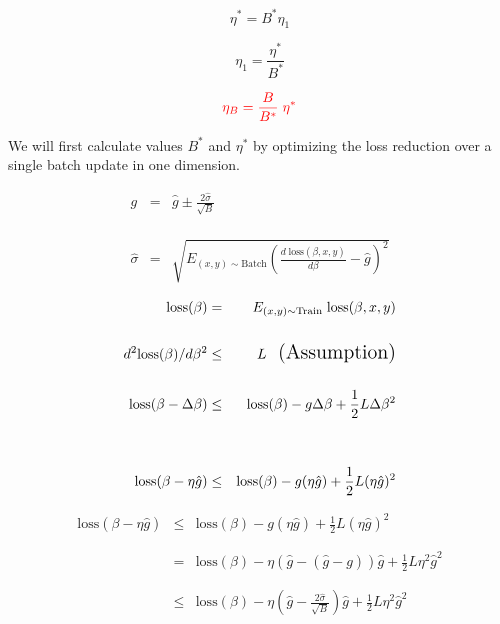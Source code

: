 {{\vfill
$$\eta^* = B^* \eta_1$$

\vfill
$$\eta_1 = \frac{\eta^*}{B^*}$$

\vfill
$${\color{red} \eta_B = \frac{B}{B^*} \;\eta^*}$$


We will first calculate values $B^*$ and $\eta^*$ by optimizing the loss reduction over a single batch update in one dimension.

\vfill
\begin{eqnarray*}
  g & = & \hat{g} \pm \frac{2\hat{\sigma}}{\sqrt{B}} \\
  \\
  \\
  \\
  \hat{\sigma} & = & \sqrt{E_{(x,y) \sim \mathrm{Batch}} \left(\frac{d\;\mathrm{loss}(\beta,x,y)}{d \beta} - \hat{g}\right)^2}
\end{eqnarray*}


\begin{eqnarray*}
  \mathrm{loss}(\beta) & = & E_{(x,y) \sim \mathrm{Train}}\;\mathrm{loss}(\beta,x,y) \\
  \\
  d^2 \mathrm{loss}(\beta)/d \beta^2 & \leq & L \;\;\;\mbox{\Large (Assumption)} \\
  \\
  \mathrm{loss}(\beta - \Delta\beta) & \leq & \mathrm{loss}(\beta) - g\Delta \beta + \frac{1}{2}L\Delta \beta^2 \\
  \\
  \\
  \mathrm{loss}(\beta - \eta\hat{g}) & \leq & \mathrm{loss}(\beta) - g(\eta\hat{g}) + \frac{1}{2}L(\eta\hat{g})^2
\end{eqnarray*}


\begin{eqnarray*}
  \mathrm{loss}(\beta - \eta\hat{g}) & \leq & \mathrm{loss}(\beta) - g(\eta\hat{g}) + \frac{1}{2}L(\eta\hat{g})^2 \\
  \\
  \\
  & = &  \mathrm{loss}(\beta) - \eta (\hat{g} - (\hat{g} -g)) \hat{g} + \frac{1}{2}L\eta^2 \hat{g}^2 \\
  \\
  \\
  & \leq &  \mathrm{loss}(\beta) - \eta \left(\hat{g} - \frac{2\hat{\sigma}}{\sqrt{B}}\right)\hat{g} + \frac{1}{2}L \eta^2 \hat{g}^2
\end{eqnarray*}

}}
